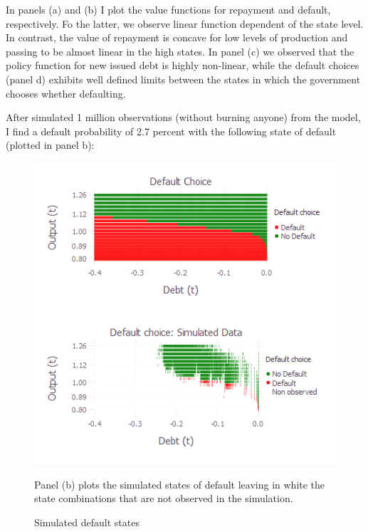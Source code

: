 \documentclass[12pt, a4paper]{article}
\begin{document}
\par In panels (a) and (b) I plot the value functions for repayment and default, respectively. Fo the latter, we observe linear function dependent of the state level. In contrast, the value of repayment is concave for low levels of production and passing to be almost linear in the high states. In panel (c) we observed that the policy function for new issued debt is highly non-linear, while the default choices (panel d) exhibits well defined limits between the states in which the government chooses whether defaulting.\\
\par After simulated 1 million observations (without burning anyone) from the model, I find a default probability of 2.7 percent with the following state of default (plotted in panel b):
\begin{figure}[!hbt]
	\centering
	\caption{Simulated default states}
	\includegraphics[scale=0.86]{../Plots/heat1.png}
	\begin{minipage}{0.65\textwidth}
		{\scriptsize Panel (b) plots the simulated states of default leaving in white the state combinations that are not observed in the simulation.\par}
	\end{minipage}
\end{figure}
\end{document}
